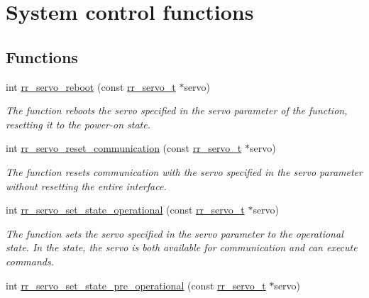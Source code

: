 \hypertarget{group___system__control}{}\section{System control functions}
\label{group___system__control}
\subsection*{Functions}
\begin{DoxyCompactItemize}
\item 
int \hyperlink{group___system__control_ga1239a8f4a80ea1c33f599a0cdc58048c}{rr\+\_\+servo\+\_\+reboot} (const \hyperlink{structrr__servo__t}{rr\+\_\+servo\+\_\+t} $\ast$servo)
\begin{DoxyCompactList}\small\item\em The function reboots the servo specified in the \textquotesingle{}servo\textquotesingle{} parameter of the function, resetting it to the power-\/on state. \end{DoxyCompactList}\item 
int \hyperlink{group___system__control_ga59060b95f6ee0614cbec3500ba08b7a0}{rr\+\_\+servo\+\_\+reset\+\_\+communication} (const \hyperlink{structrr__servo__t}{rr\+\_\+servo\+\_\+t} $\ast$servo)
\begin{DoxyCompactList}\small\item\em The function resets communication with the servo specified in the \textquotesingle{}servo\textquotesingle{} parameter without resetting the entire interface. \end{DoxyCompactList}\item 
int \hyperlink{group___system__control_ga799d61d6eb811cba7f9097a5d9bfd0a8}{rr\+\_\+servo\+\_\+set\+\_\+state\+\_\+operational} (const \hyperlink{structrr__servo__t}{rr\+\_\+servo\+\_\+t} $\ast$servo)
\begin{DoxyCompactList}\small\item\em The function sets the servo specified in the \textquotesingle{}servo\textquotesingle{} parameter to the operational state. In the state, the servo is both available for communication and can execute commands. \end{DoxyCompactList}\item 
int \hyperlink{group___system__control_ga39559219bfb36d4d9359365ac3656a74}{rr\+\_\+servo\+\_\+set\+\_\+state\+\_\+pre\+\_\+operational} (const \hyperlink{structrr__servo__t}{rr\+\_\+servo\+\_\+t} $\ast$servo)

\end{DoxyCompactItemize}
